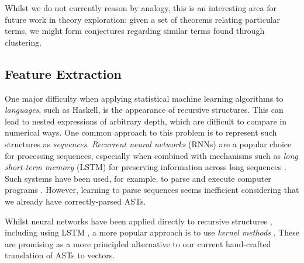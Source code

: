 Whilst we do not currently reason by analogy, this is an interesting area for future work in theory exploration: given a set of theorems relating particular terms, we might form conjectures regarding similar terms found through clustering.

\subsection{Feature Extraction}

One major difficulty when applying statistical machine learning algorithms to \emph{languages}, such as Haskell, is the appearance of recursive structures. This can lead to nested expressions of arbitrary depth, which are difficult to compare in numerical ways. One common approach to this problem is to represent such structures as \emph{sequences}. \emph{Recurrent neural networks} (RNNs) are a popular choice for processing sequences, especially when combined with mechanisms such as \emph{long short-term memory} (LSTM) for preserving information across long sequences \cite{hochreiter1997long}. Such systems have been used, for example, to parse and execute computer programs \cite{zaremba2014learning}. However, learning to parse sequences seems inefficient considering that we already have correctly-parsed ASTs.

Whilst neural networks have been applied directly to recursive structures \cite{goller1996learning}, including using LSTM \cite{zhu2015long}, a more popular approach is to use \emph{kernel methods} \cite{bakir2007predicting}. These are promising as a more principled alternative to our current hand-crafted translation of ASTs to vectors.
